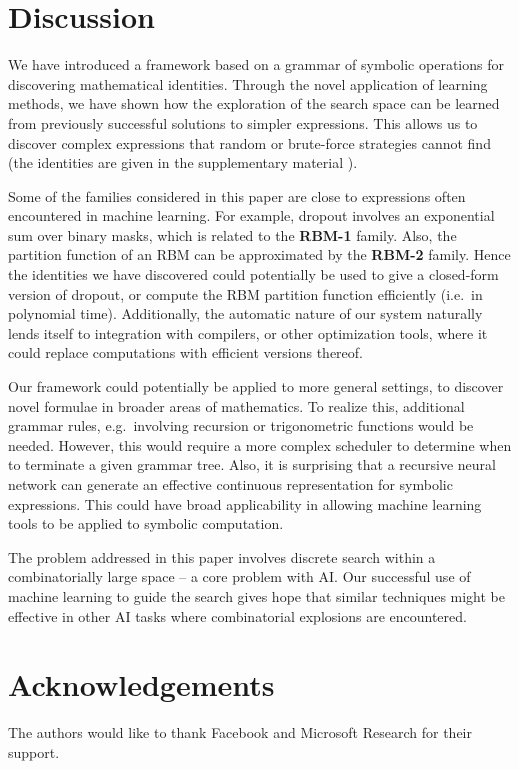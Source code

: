 \documentclass{article} %
\begin{document}
\vspace{-3mm}
\section{Discussion}
\vspace{-2mm}
\label{sec:discussion}
We have introduced a framework based on a grammar of symbolic
operations for discovering mathematical identities. Through the novel
application of learning methods, we have shown how the exploration of
the search space can be learned from previously successful solutions
to simpler expressions. This allows us to discover complex expressions
that random or brute-force strategies cannot find (the identities are
given in the supplementary material \cite{arxiv}). 

Some of the families considered in this paper are close to
expressions often encountered in machine learning. For example,
dropout involves an exponential sum over binary masks, which is
related to the {\bf RBM-1} family. Also, the partition function of an
RBM can be approximated by the {\bf RBM-2} family. Hence the identities
we have discovered could potentially be used to give a closed-form
version of dropout, or compute the RBM partition function efficiently
(i.e.~in polynomial time). 
Additionally, the automatic nature of our system naturally lends itself to
integration with compilers, or other optimization tools, where it could replace computations with
efficient versions thereof.

Our framework could potentially be applied to more general settings,
to discover novel formulae in broader areas of mathematics. To
realize this, additional grammar rules, e.g.~involving
recursion or trigonometric functions would be needed. However, this
would require a more complex scheduler to determine when to terminate
a given grammar tree. 
Also, it is surprising that a recursive neural network can generate an
effective continuous representation for symbolic expressions. This
could have broad applicability in allowing machine learning tools to
be applied to symbolic computation.

The problem addressed in this paper involves discrete search within a
combinatorially large space -- a core problem with AI. Our successful
use of machine learning to guide the search gives hope that similar
techniques might be effective in other AI tasks where combinatorial
explosions are encountered.

\vspace{-2mm}
\section*{Acknowledgements}
\vspace{-2mm} 
The authors would like to thank Facebook and Microsoft Research for their support.  

\small



%

\end{document}
